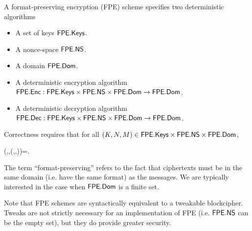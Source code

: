 
A format-preserving encryption (FPE) scheme specifies two deterministic algorithms
\begin{itemize}
	\item A set of keys $\mathsf{FPE}.\mathsf{Keys}$.
	\item A nonce-space $\mathsf{FPE}.\mathsf{NS}$.
	\item A domain $\mathsf{FPE}.\mathsf{Dom}$.
	\item A deterministic encryption algorithm $\mathsf{FPE}.\mathsf{Enc}:\mathsf{FPE}.\mathsf{Keys}\times\mathsf{FPE}.\mathsf{NS}\times\mathsf{FPE}.\mathsf{Dom}\to\mathsf{FPE}.\mathsf{Dom}$.
	\item A deterministic decryption algorithm $\mathsf{FPE}.\mathsf{Dec}:\mathsf{FPE}.\mathsf{Keys}\times\mathsf{FPE}.\mathsf{NS}\times\mathsf{FPE}.\mathsf{Dom}\to\mathsf{FPE}.\mathsf{Dom}$.
\end{itemize}
Correctness requires that for all $(K,N,M)\in\mathsf{FPE}.\mathsf{Keys}\times\mathsf{FPE}.\mathsf{NS}\times\mathsf{FPE}.\mathsf{Dom}$,
\begin{newmath}
	\Dec{\FPE}(\key,\nonce,\Enc{\FPE}(\key,\nonce,\msg))=\msg.
\end{newmath}

The term ``format-preserving'' refers to the fact that ciphertexts must be in the same domain (i.e. have the same format) as the messages. We are typically interested in the case when $\mathsf{FPE}.\mathsf{Dom}$ is a finite set.

Note that FPE schemes are syntactically equivalent to a tweakable blockcipher. Tweaks are not strictly necessary for an implementation of FPE (i.e. $\mathsf{FPE}.\mathsf{NS}$ can be the empty set), but they do provide greater security.